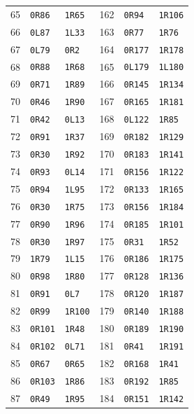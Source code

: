 \begin{longtable}{rllrll}
65 & \texttt{0R86} & \texttt{1R65} & 162 & \texttt{0R94} & \texttt{1R106} \\
66 & \texttt{0L87} & \texttt{1L33} & 163 & \texttt{0R77} & \texttt{1R76} \\
67 & \texttt{0L79} & \texttt{0R2} & 164 & \texttt{0R177} & \texttt{1R178} \\
68 & \texttt{0R88} & \texttt{1R68} & 165 & \texttt{0L179} & \texttt{1L180} \\
69 & \texttt{0R71} & \texttt{1R89} & 166 & \texttt{0R145} & \texttt{1R134} \\
70 & \texttt{0R46} & \texttt{1R90} & 167 & \texttt{0R165} & \texttt{1R181} \\
71 & \texttt{0R42} & \texttt{0L13} & 168 & \texttt{0L122} & \texttt{1R85} \\
72 & \texttt{0R91} & \texttt{1R37} & 169 & \texttt{0R182} & \texttt{1R129} \\
73 & \texttt{0R30} & \texttt{1R92} & 170 & \texttt{0R183} & \texttt{1R141} \\
74 & \texttt{0R93} & \texttt{0L14} & 171 & \texttt{0R156} & \texttt{1R122} \\
75 & \texttt{0R94} & \texttt{1L95} & 172 & \texttt{0R133} & \texttt{1R165} \\
76 & \texttt{0R30} & \texttt{1R75} & 173 & \texttt{0R156} & \texttt{1R184} \\
77 & \texttt{0R90} & \texttt{1R96} & 174 & \texttt{0R185} & \texttt{1R101} \\
78 & \texttt{0R30} & \texttt{1R97} & 175 & \texttt{0R31} & \texttt{1R52} \\
79 & \texttt{1R79} & \texttt{1L15} & 176 & \texttt{0R186} & \texttt{1R175} \\
80 & \texttt{0R98} & \texttt{1R80} & 177 & \texttt{0R128} & \texttt{1R136} \\
81 & \texttt{0R91} & \texttt{0L7} & 178 & \texttt{0R120} & \texttt{1R187} \\
82 & \texttt{0R99} & \texttt{1R100} & 179 & \texttt{0R140} & \texttt{1R188} \\
83 & \texttt{0R101} & \texttt{1R48} & 180 & \texttt{0R189} & \texttt{1R190} \\
84 & \texttt{0R102} & \texttt{0L71} & 181 & \texttt{0R41} & \texttt{1R191} \\
85 & \texttt{0R67} & \texttt{0R65} & 182 & \texttt{0R168} & \texttt{1R41} \\
86 & \texttt{0R103} & \texttt{1R86} & 183 & \texttt{0R192} & \texttt{1R85} \\
87 & \texttt{0R49} & \texttt{1R95} & 184 & \texttt{0R151} & \texttt{1R142} \\

\end{longtable}
